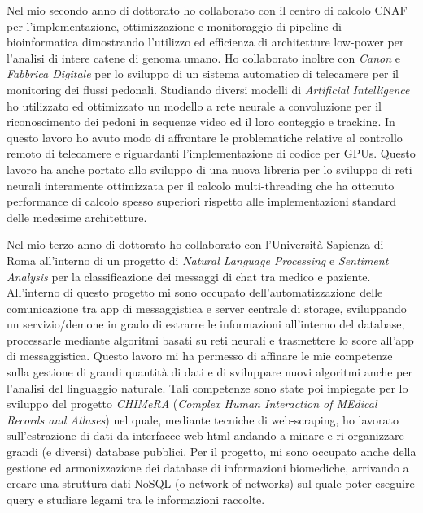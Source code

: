 \documentclass[a4paper,11pt]{article}
\begin{document}
Nel mio secondo anno di dottorato ho collaborato con il centro di calcolo CNAF per l'implementazione, ottimizzazione e monitoraggio di pipeline di bioinformatica dimostrando l'utilizzo ed efficienza di architetture low-power per l'analisi di intere catene di genoma umano.
Ho collaborato inoltre con \emph{Canon} e \emph{Fabbrica Digitale} per lo sviluppo di un sistema automatico di telecamere per il monitoring dei flussi pedonali.
Studiando diversi modelli di \emph{Artificial Intelligence} ho utilizzato ed ottimizzato un modello a rete neurale a convoluzione per il riconoscimento dei pedoni in sequenze video ed il loro conteggio e tracking.
In questo lavoro ho avuto modo di affrontare le problematiche relative al controllo remoto di telecamere e riguardanti l'implementazione di codice per GPUs.
Questo lavoro ha anche portato allo sviluppo di una nuova libreria per lo sviluppo di reti neurali interamente ottimizzata per il calcolo multi-threading che ha ottenuto performance di calcolo spesso superiori rispetto alle implementazioni standard delle medesime architetture.

Nel mio terzo anno di dottorato ho collaborato con l'Università Sapienza di Roma all'interno di un progetto di \emph{Natural Language Processing} e \emph{Sentiment Analysis} per la classificazione dei messaggi di chat tra medico e paziente.
All'interno di questo progetto mi sono occupato dell'automatizzazione delle comunicazione tra app di messaggistica e server centrale di storage, sviluppando un servizio/demone in grado di estrarre le informazioni all'interno del database, processarle mediante algoritmi basati su reti neurali e trasmettere lo score all'app di messaggistica.
Questo lavoro mi ha permesso di affinare le mie competenze sulla gestione di grandi quantità di dati e di sviluppare nuovi algoritmi anche per l'analisi del linguaggio naturale.
Tali competenze sono state poi impiegate per lo sviluppo del progetto \emph{CHIMeRA} (\emph{Complex Human Interaction of MEdical Records and Atlases}) nel quale, mediante tecniche di web-scraping, ho lavorato sull'estrazione di dati da interfacce web-html andando a minare e ri-organizzare grandi (e diversi) database pubblici.
Per il progetto, mi sono occupato anche della gestione ed armonizzazione dei database di informazioni biomediche, arrivando a creare una struttura dati NoSQL (o network-of-networks) sul quale poter eseguire query e studiare legami tra le informazioni raccolte.
\end{document}
